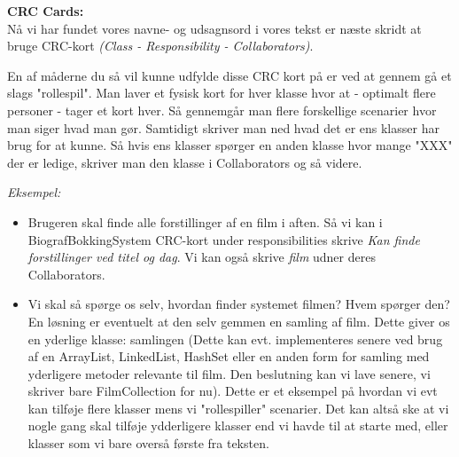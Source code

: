 \documentclass[a4paper,12pt]{article}
\begin{document}
\textbf{CRC Cards:} \\
Nå vi har fundet vores navne- og udsagnsord i vores tekst er næste skridt at bruge CRC-kort \textit{(Class - Responsibility - Collaborators)}.
\begin{center}
    
\end{center}
            
En af måderne du så vil kunne udfylde disse CRC kort på er ved at gennem gå et slags "rollespil". Man laver et fysisk kort for hver klasse hvor at - optimalt flere personer - tager et kort hver. Så gennemgår man flere forskellige scenarier hvor man siger hvad man gør. Samtidigt skriver man ned hvad det er ens klasser har brug for at kunne. Så hvis ens klasser spørger en anden klasse hvor mange "XXX" der er ledige, skriver man den klasse i Collaborators og så videre.

\textit{Eksempel:}
\begin{itemize}
    \item Brugeren skal finde alle forstillinger af en film i aften. Så vi kan i BiografBokkingSystem CRC-kort under responsibilities skrive \textit{Kan finde forstillinger ved titel og dag}. Vi kan også skrive \textit{film} udner deres Collaborators.
    \item   Vi skal så spørge os selv, hvordan finder systemet filmen? Hvem spørger den?
            En løsning er eventuelt at den selv gemmen en samling af film. Dette giver os en yderlige klasse: samlingen (Dette kan evt. implementeres senere ved brug af en ArrayList, LinkedList, HashSet eller en anden form for samling med yderligere metoder relevante til film. Den beslutning kan vi lave senere, vi skriver bare FilmCollection for nu). Dette er et eksempel på hvordan vi evt kan tilføje flere klasser mens vi "rollespiller" scenarier. Det kan altså ske at vi nogle gang skal tilføje ydderligere klasser end vi havde til at starte med, eller klasser som vi bare overså første fra teksten.
\end{itemize}
\end{document}
